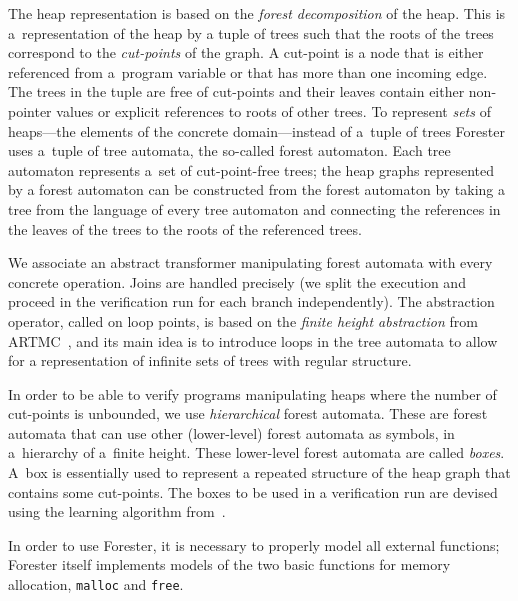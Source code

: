 The heap representation is based on the \emph{forest decomposition} of the heap.
This is a~representation of the heap by a tuple of trees such that the roots of
the trees correspond to the \emph{cut-points} of the graph.
A cut-point is a node that is either referenced from a~program variable or that
has more than one incoming edge.
The trees in the tuple are free of cut-points and their leaves contain either
non-pointer values or explicit references to roots of other trees.
To represent \emph{sets} of heaps---the elements of the concrete
domain---instead of a~tuple of trees Forester uses a~tuple of tree automata,
the so-called forest automaton.
Each tree automaton represents a~set of cut-point-free trees; the heap graphs
represented by a forest automaton can be constructed from the forest automaton
by taking a tree from the language of every tree automaton and connecting the
references in the leaves of the trees to the roots of the referenced trees.

We associate an abstract transformer manipulating forest automata with
every concrete operation.
Joins are handled precisely (we split the execution and proceed in the
verification run for each branch independently).
The abstraction operator, called on loop points, is based on the
\emph{finite height abstraction} from ARTMC~\cite{artmc}, and its main idea is to introduce
loops in the tree automata to allow for a representation of infinite sets of
trees with regular structure.

In order to be able to verify programs manipulating heaps where the number of
cut-points is unbounded, we use \emph{hierarchical} forest automata.
These are forest automata that can use other (lower-level) forest automata as
symbols, in a~hierarchy of a~finite height.
These lower-level forest automata are called \emph{boxes}.
A~box is essentially used to represent a repeated structure of the heap graph
that contains some cut-points.
The boxes to be used in a verification run are devised using the learning
algorithm from~\cite{holik:forest-boxes}.

In order to use Forester, it is necessary to properly model all external
functions; Forester itself implements models of the two basic functions for memory
allocation, \texttt{malloc} and \texttt{free}.



